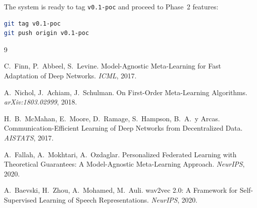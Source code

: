 \documentclass[11pt,a4paper]{article}
\theoremstyle{definition}
\begin{document}
The system is ready to tag \texttt{v0.1-poc} and proceed to Phase~2 features:

\begin{lstlisting}[language=bash]
git tag v0.1-poc
git push origin v0.1-poc
\end{lstlisting}


\begin{thebibliography}{9}

C.\ Finn, P.\ Abbeel, S.\ Levine.
\newblock Model-Agnostic Meta-Learning for Fast Adaptation of Deep Networks.
\newblock \emph{ICML}, 2017.

A.\ Nichol, J.\ Achiam, J.\ Schulman.
\newblock On First-Order Meta-Learning Algorithms.
\newblock \emph{arXiv:1803.02999}, 2018.

H.\ B.\ McMahan, E.\ Moore, D.\ Ramage, S.\ Hampson, B.\ A.\ y Arcas.
\newblock Communication-Efficient Learning of Deep Networks from Decentralized
Data.
\newblock \emph{AISTATS}, 2017.

A.\ Fallah, A.\ Mokhtari, A.\ Ozdaglar.
\newblock Personalized Federated Learning with Theoretical Guarantees:
A Model-Agnostic Meta-Learning Approach.
\newblock \emph{NeurIPS}, 2020.

A.\ Baevski, H.\ Zhou, A.\ Mohamed, M.\ Auli.
\newblock wav2vec 2.0: A Framework for Self-Supervised Learning of Speech
Representations.
\newblock \emph{NeurIPS}, 2020.

\end{thebibliography}
\end{document}
